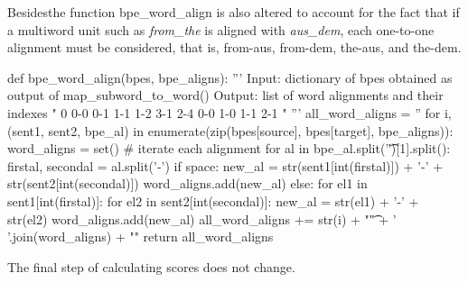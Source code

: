 Besidesthe function bpe\_word\_align is also altered to account for the fact that if a multiword unit such as \emph{from\_the} is aligned with \emph{aus\_dem}, each one-to-one alignment must be considered, that is, from-aus, from-dem, the-aus, and the-dem.

\begin{python}

def bpe_word_align(bpes, bpe_aligns):
  '''
  Input: dictionary of bpes obtained as output of map_subword_to_word()
  Output: list of word alignments and their indexes
    "
      0   0-0 0-1 1-1 1-2 3-1 2-4    0-0 1-0 1-1 2-1 \n
    "
  '''
  all_word_aligns = ''
  for i, (sent1, sent2, bpe_al) in enumerate(zip(bpes[source], bpes[target], bpe_aligns)):
    word_aligns = set()
    # iterate each alignment
    for al in bpe_al.split('\t')[1].split():
      firstal, secondal = al.split('-')
      if space:
        new_al = str(sent1[int(firstal)]) + '-' + str(sent2[int(secondal)])
        word_aligns.add(new_al)
      else:
        for el1 in sent1[int(firstal)]:
          for el2 in sent2[int(secondal)]:
            new_al = str(el1) + '-' + str(el2)
            word_aligns.add(new_al)
    all_word_aligns += str(i) + "\t" + ' '.join(word_aligns) + "\n"
  return all_word_aligns
\end{python}

The final step of calculating scores does not change.

\begin{python}

\end{python}
